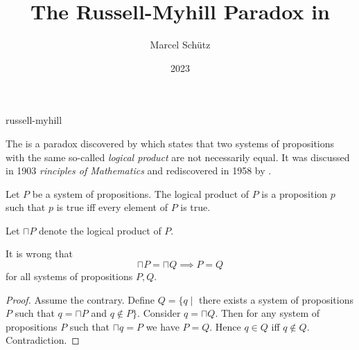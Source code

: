 \documentclass{stex}
\begin{document}
\title{The Russell-Myhill Paradox in \Naproche}
\author{Marcel Schütz}
\date{2023}
\maketitle
\begin{smodule}{russell-myhill}
\begin{sparagraph}
  The \emph{} is a paradox discovered by  which states that two systems of propositions with the same so-called \emph{logical product} are not necessarily equal.
  It was discussed in  1903 \emph{rinciples of Mathematics} \cite[Appendix B]{Russell1903} and rediscovered in 1958 by  \cite{Myhill1958}.
\end{sparagraph}

\begin{forthel}

  \begin{signature*}
    Let $P$ be a system of propositions.
    The logical product of $P$ is a proposition $p$ such that $p$ is true iff every element of $P$ is true.
  \end{signature*}

  Let $\sqcap P$ denote the logical product of $P$.

  \begin{theorem*}\label{russell_myhill_paradox}
    It is wrong that
    \[ \sqcap P = \sqcap Q \implies P = Q \]
    for all systems of propositions $P, Q$.
  \end{theorem*}
  \begin{proof}
    Assume the contrary.
    Define $Q = \{ q \mid$ there exists a system of propositions $P$ such that $q = \sqcap P$ and $q \notin P \}$.
    Consider $q = \sqcap Q$.
    Then for any system of propositions $P$ such that $\sqcap q = P$ we have $P = Q$.
    Hence $q \in Q$ iff $q \notin Q$.
    Contradiction.
  \end{proof}
\end{forthel}
\end{smodule}
\printbibliography
\end{document}
